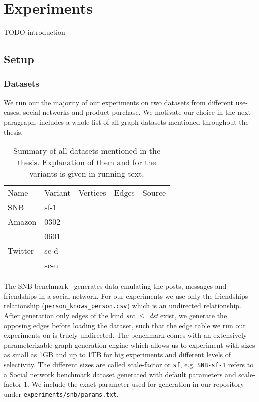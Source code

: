 \section{Experiments}

TODO introduction

\subsection{Setup}

\subsubsection{Datasets}
We run our the majority of our experiments on two datasets from different use-cases, social networks and product purchase.
We motivate our choice in the next paragraph.
 includes a whole list of all graph datasets mentioned throughout the thesis.

\begin{table}[]  %
    \begin{tabular}{lllll}
        Name    & Variant & Vertices & Edges & Source          \\
        SNB     & sf-1    &          &       & \cite{snb}      \\
        Amazon  & 0302    &          &       & \cite{snapnets} \\
                & 0601    &          &       & \cite{snapnets} \\
        Twitter & sc-d    &          &       & \cite{snapnets} \\
                & sc-u    &          &       & \cite{snapnets}
    \end{tabular}
    \caption{Summary of all datasets mentioned in the thesis.
      Explanation of them and for the variants is given in running text.
    }
    \label{table:datasets}
\end{table}


The SNB benchmark~\cite{snb} generates data emulating the posts, messages and friendships in a social network.
For our experiments we use only the friendships relationship (\texttt{person\_knows\_person.csv}) which is an undirected relationship.
After generation only edges of the kind \textit{src $\le$ dst} exist, we generate the opposing edges before loading the dataset, such that the edge table we run our experiments
on is truely undirected.
The benchmark comes with an extensively parameterizable graph generation engine
which allows us to experiment with sizes as small as 1GB and up to 1TB for big experiments and different levels of selectivity.
The different sizes are called scale-factor or \texttt{sf}, e.g. \texttt{SNB-sf-1} refers to a Social network benchmark dataset generated with
default parameters and scale-factor 1.
We include the exact parameter used for generation in our repository under \texttt{experiments/snb/params.txt}. %


